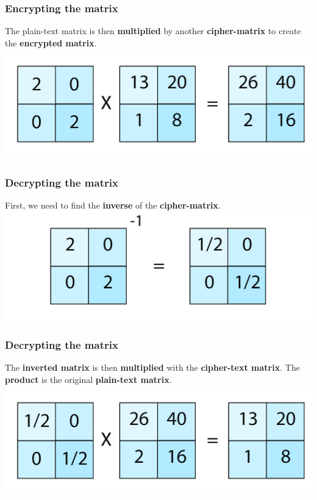 \documentclass[11pt]{beamer}
\begin{document}
\begin{frame}\frametitle{Encrypting the matrix}

The plain-text matrix is then \textbf{multiplied} by another \textbf{cipher-matrix} to create the \textbf{encrypted matrix}.
\center \includegraphics[scale=0.2]{multiply_1}

\end{frame}

\begin{frame}\frametitle{Decrypting the matrix}

First, we need to find the \textbf{inverse} of the \textbf{cipher-matrix}.\\[10mm]
\center \includegraphics[scale=0.2]{inverse_1}
\end{frame}

\begin{frame}\frametitle{Decrypting the matrix}

The \textbf{inverted matrix} is then \textbf{multiplied} with the \textbf{cipher-text matrix}.
The \textbf{product} is the original \textbf{plain-text matrix}.
\center \includegraphics[scale=0.2]{multiply_2}
\end{frame}
\end{document}
